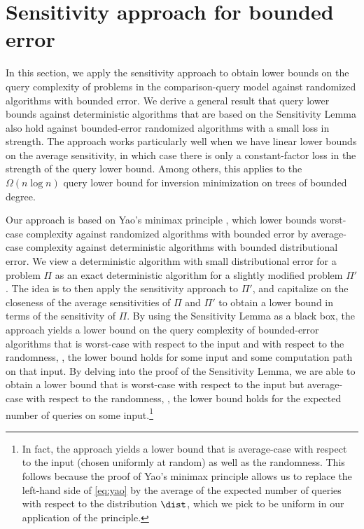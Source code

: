 \documentclass{toc}
\begin{document}
\section{Sensitivity approach for bounded error}
\label{sec:random}

In this section, we apply the sensitivity approach to obtain lower bounds on the query complexity of problems in the comparison-query model against randomized algorithms with bounded error. We derive a general
%
result that query lower bounds against deterministic algorithms that are based on the Sensitivity
%
Lemma also  %
hold against bounded-error randomized algorithms with a small loss in strength. The approach works particularly well when we have linear lower bounds on the average sensitivity, in which case there is only a constant-factor loss in the strength of the query lower bound. Among others, this applies to the $\Omega(n \log n)$ query lower bound for inversion minimization on trees of bounded degree.

%
%

Our approach is based on Yao's minimax principle \cite{Yao77}, which lower bounds worst-case complexity against randomized algorithms with bounded error by average-case complexity against deterministic algorithms with bounded distributional error. We view a deterministic algorithm with small distributional error for a problem $\Pi$ as an exact deterministic algorithm for a slightly modified problem $\Pi'$. The idea is to then apply the sensitivity approach to $\Pi'$, and capitalize on the closeness of the average sensitivities of $\Pi$ and $\Pi'$ to obtain a lower bound in terms of the sensitivity of $\Pi$. By using the Sensitivity Lemma as a %
black box,  %
the approach yields a lower bound on the query complexity of bounded-error algorithms that is worst-case with respect to the input and with respect to the randomness, \ie, the lower bound holds for some input and some computation path on that input. By delving into the proof of the Sensitivity Lemma, we are able to obtain a lower bound that is worst-case with respect to the input but average-case with respect to the randomness, \ie, the lower bound holds for the expected number of queries on some input.\footnote{In fact, the approach yields a lower bound that is average-case with respect to the input (chosen uniformly at random) as well as the randomness. This follows because the proof of Yao's minimax principle allows us to replace the left-hand side of \eqref{eq:yao} by the average of the expected number of queries with respect to the distribution $\dist$, which we pick to be uniform in our application of the principle.}
\end{document}
